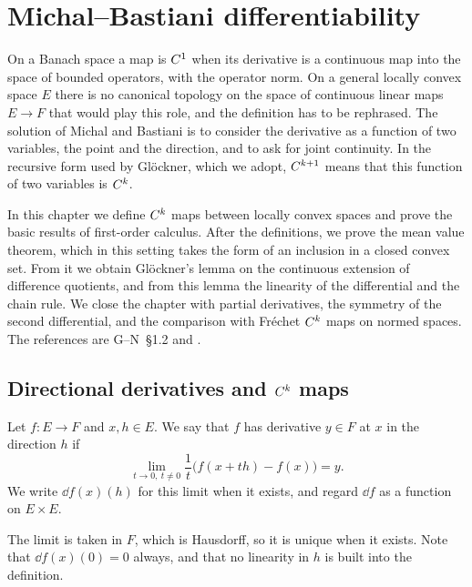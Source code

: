 \chapter{Michal--Bastiani differentiability}
\label{chap:differentiability}

On a Banach space a map is $C^{1}$ when its derivative is a continuous map into the space of
bounded operators, with the operator norm. On a general locally convex space $E$ there is no
canonical topology on the space of continuous linear maps $E \to F$ that would play this role,
and the definition has to be rephrased. The solution of Michal \cite{Mic38} and Bastiani
\cite{Bas64} is to consider the derivative as a function of two variables, the point and the
direction, and to ask for joint continuity. In the recursive form used by Glöckner, which we
adopt, $C^{k+1}$ means that this function of two variables is $C^{k}$.

In this chapter we define $C^{k}$ maps between locally convex spaces and prove the basic
results of first-order calculus. After the definitions, we prove the mean value theorem, which
in this setting takes the form of an inclusion in a closed convex set. From it we obtain
Glöckner's lemma on the continuous extension of difference quotients, and from this lemma the
linearity of the differential and the chain rule. We close the chapter with partial
derivatives, the symmetry of the second differential, and the comparison with Fréchet $C^{k}$
maps on normed spaces. The references are G--N~\S1.2 and \cite[\S I.2]{Nee06}.

\section{Directional derivatives and $C^{k}$ maps}

\begin{definition}
  \label{def:dir-deriv}
  \leanok
  Let $f \colon E \to F$ and $x, h \in E$. We say that $f$ has derivative $y \in F$ at $x$ in
  the direction $h$ if
  \[
    \lim_{t \to 0,\ t \neq 0} \frac{1}{t}\bigl(f(x + t h) - f(x)\bigr) = y .
  \]
  We write $\dd f(x)(h)$ for this limit when it exists, and regard $\dd f$ as a function on
  $E \times E$.
\end{definition}

The limit is taken in $F$, which is Hausdorff, so it is unique when it exists. Note that
$\dd f(x)(0) = 0$ always, and that no linearity in $h$ is built into the definition.

